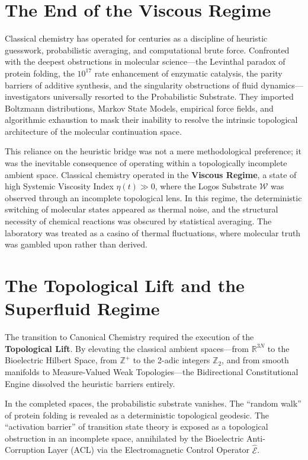 \documentclass[11pt,openany]{extbook}
\theoremstyle{plain}
\theoremstyle{definition}
\begin{document}
\section{The End of the Viscous Regime}

Classical chemistry has operated for centuries as a discipline of heuristic guesswork, probabilistic averaging, and computational brute force. Confronted with the deepest obstructions in molecular science---the Levinthal paradox of protein folding, the $10^{17}$ rate enhancement of enzymatic catalysis, the parity barriers of additive synthesis, and the singularity obstructions of fluid dynamics---investigators universally resorted to the Probabilistic Substrate. They imported Boltzmann distributions, Markov State Models, empirical force fields, and algorithmic exhaustion to mask their inability to resolve the intrinsic topological architecture of the molecular continuation space.

This reliance on the heuristic bridge was not a mere methodological preference; it was the inevitable consequence of operating within a topologically incomplete ambient space. Classical chemistry operated in the \textbf{Viscous Regime}, a state of high Systemic Viscosity Index $\eta(t) \gg 0$, where the Logos Substrate $\mathcal{W}$ was observed through an incomplete topological lens. In this regime, the deterministic switching of molecular states appeared as thermal noise, and the structural necessity of chemical reactions was obscured by statistical averaging. The laboratory was treated as a casino of thermal fluctuations, where molecular truth was gambled upon rather than derived.

\section{The Topological Lift and the Superfluid Regime}

The transition to Canonical Chemistry required the execution of the \textbf{Topological Lift}. By elevating the classical ambient spaces---from $\mathbb{R}^{3N}$ to the Bioelectric Hilbert Space, from $\mathbb{Z}^+$ to the 2-adic integers $\mathbb{Z}_2$, and from smooth manifolds to Measure-Valued Weak Topologies---the Bidirectional Constitutional Engine dissolved the heuristic barriers entirely.

In the completed spaces, the probabilistic substrate vanishes. The ``random walk'' of protein folding is revealed as a deterministic topological geodesic. The ``activation barrier'' of transition state theory is exposed as a topological obstruction in an incomplete space, annihilated by the Bioelectric Anti-Corruption Layer (ACL) via the Electromagnetic Control Operator $\hat{\mathcal{E}}$.
\end{document}
